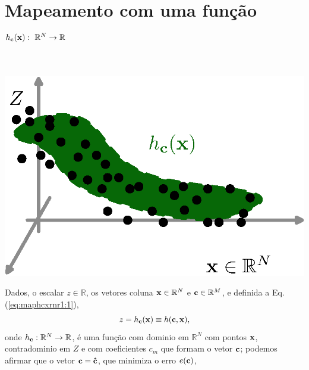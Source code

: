 \section{ Mapeamento com uma função $h_{\VECTOR{c}}(\VECTOR{x}):~\mathbb{R}^N \rightarrow \mathbb{R}$}


\begin{theorem}
\label{theo:maphcxrnr1}
~\\
\begin{minipage}{0.4\textwidth}
\centering
\includegraphics[width=0.95\linewidth]{chapters/mapeamento/mapeamento-hxn-nonlinear.eps} 
\end{minipage}
\begin{minipage}{0.6\textwidth}
Dados,
o escalar $z \in \mathbb{R}$, os vetores coluna  $\VECTOR{x} \in \mathbb{R}^N$ e $\VECTOR{c} \in \mathbb{R}^M$, e 
definida a Eq. (\ref{eq:maphcxrnr1:1}), 
\begin{equation}\label{eq:maphcxrnr1:1}
z=h_{\VECTOR{c}}(\VECTOR{x})\equiv h(\VECTOR{c},\VECTOR{x}),
\end{equation}
onde $h_{\VECTOR{c}}:\mathbb{R}^N \rightarrow \mathbb{R}$, 
é uma função com dominio em $\mathbb{R}^N$ com pontos $\VECTOR{x}$, contradominio em $Z$
e com coeficientes $c_m$ que formam o vetor $\VECTOR{c}$;
podemos afirmar que o vetor $\VECTOR{c}=\VECTOR{\hat{c}}$,
que minimiza o erro $e(\VECTOR{c})$,
\end{minipage}


\end{theorem}
